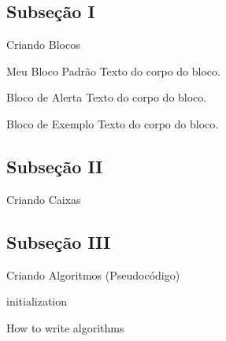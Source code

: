 \documentclass{libs/ufc_format}
\begin{document}
\subsection{Subseção I}
\begin{frame}{Criando Blocos}
    \begin{block}{Meu Bloco Padrão}
        Texto do corpo do bloco.
    \end{block}

    \begin{alertblock}{Bloco de Alerta}
        Texto do corpo do bloco.
    \end{alertblock}

    \begin{exampleblock}{Bloco de Exemplo}
        Texto do corpo do bloco.
    \end{exampleblock}   
\end{frame}

\subsection{Subseção II}
\begin{frame}{Criando Caixas}

    \pause


    \pause

\end{frame}

\subsection{Subseção III}
\begin{frame}{Criando Algoritmos (Pseudocódigo)}
    \begin{algorithm}[H]
        \SetAlgoLined
        \LinesNumbered
         initialization\;
         \caption{How to write algorithms}
    \end{algorithm}
\end{frame}
\end{document}
